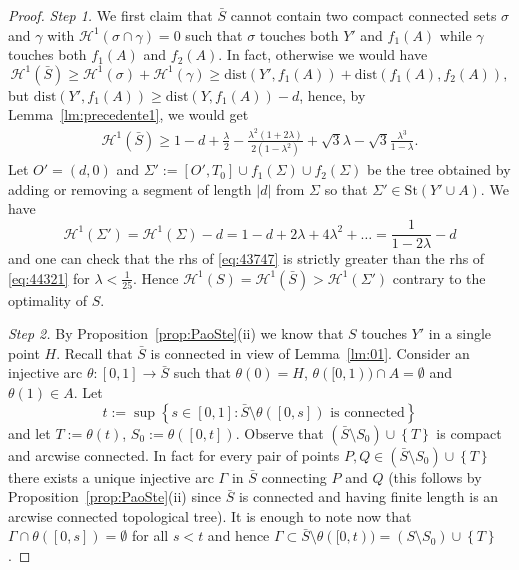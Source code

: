 \documentclass{amsart}
\renewcommand{\H}{\mathcal H}
\newcommand{\abs}[1]{\left\vert #1 \right\vert}
\newcommand{\ENCLOSE}[1]{\left\{#1\right\}}
\newcommand{\St}{\mathrm{St}}
\renewcommand{\H}{\mathcal{H}}
\newcommand{\dist}{\mathrm{dist}}
\theoremstyle{definition}
\theoremstyle{remark}
\begin{document}
\begin{proof}
  \emph{Step 1.}
  We first claim that $\bar S$ cannot contain 
  two compact connected sets 
  $\sigma$ and $\gamma$
  with $\H^1(\sigma\cap \gamma)=0$
  such that $\sigma$ touches both $Y'$ and $f_1(A)$ 
  while $\gamma$ touches both $f_1(A)$ and $f_2(A)$.
  In fact, otherwise we would have
  \[
    \H^1(\bar S)
    \ge \H^1(\sigma) + \H^1(\gamma)
    \ge \dist(Y', f_1(A)) + \dist(f_1(A), f_2(A)),
  \]
  but $\dist(Y', f_1(A)) \ge \dist(Y,f_1(A)) - d$,
  hence,
  by Lemma~\ref{lm:precedente1},
  we would get
  \begin{equation}
  \label{eq:43747}
  \begin{aligned}
    \H^1(\bar S)
    \ge 
    1 - d + \frac{\lambda} 2 
      - \frac{\lambda^2(1+2\lambda)}{2(1-\lambda^2)}
     +
     \sqrt 3 \lambda - \sqrt 3 \frac{\lambda^3}{1-\lambda}.
  \end{aligned}
  \end{equation}
  Let $O'=(d,0)$ and $\Sigma':=[O',T_0] \cup f_1(\Sigma) \cup f_2(\Sigma)$ 
  be the tree obtained by adding or removing a segment of length 
  $\abs{d}$ from $\Sigma$ so that $\Sigma'\in \St(Y'\cup A)$.
  We have  
  \begin{equation}\label{eq:44321}
    \H^1(\Sigma')
    = \H^1(\Sigma) - d 
    = 1 - d + 2 \lambda + 4 \lambda^2 + \dots 
    = \frac{1}{1-2\lambda}-d
  \end{equation}
  and one can check that the rhs of \eqref{eq:43747} is
  strictly greater than the rhs of \eqref{eq:44321}
  for $\lambda < \frac 1 {25}$.
  Hence $\H^1(S) =\H^1(\bar S) > \H^1(\Sigma')$ contrary 
  to the optimality of $S$.
  
  \emph{Step 2.} 
  By Proposition~\ref{prop:PaoSte}(ii) we know that $S$ touches $Y'$ in a single point $H$.
  Recall that $\bar S$ is connected in view of Lemma~\ref{lm:01}.
  Consider an injective arc $\theta\colon[0,1]\to \bar S$ 
  such that $\theta(0)=H$, $\theta([0,1))\cap A=\emptyset$ 
  and $\theta(1)\in A$.  
  Let 
  \[
    t:= \sup\ENCLOSE{s\in[0,1]\colon \bar S\setminus \theta([0,s])
  \text{ is connected}}
  \] 
  and let $T:=\theta(t)$, $S_0:=\theta([0,t])$. 
  Observe that $(\bar S\setminus S_0)\cup \ENCLOSE{T}$ 
  is compact and arcwise connected.
  In fact for every pair of points $P,Q\in (\bar S\setminus S_0)\cup \ENCLOSE{T}$
  there exists a unique injective arc $\Gamma$ in $\bar S$ 
  connecting $P$ and $Q$ (this follows by Proposition~\ref{prop:PaoSte}(ii)
  since $\bar S$ is connected and having finite length 
  is an arcwise connected topological tree).
  It is enough to note now that 
  $\Gamma\cap \theta([0,s])=\emptyset$
  for all $s<t$ and hence 
  $\Gamma\subset \bar S\setminus \theta([0,t))
  = (S\setminus S_0)\cup\ENCLOSE{T}$.
  

\end{proof}
\end{document}
